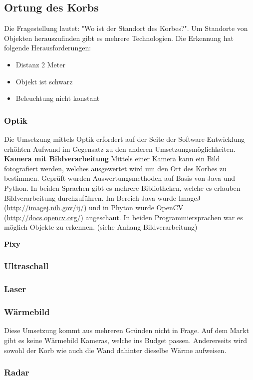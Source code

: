 \subsection{Ortung des Korbs}
Die Fragestellung lautet: "Wo ist der Standort des Korbes?". Um Standorte von Objekten herauszufinden gibt es mehrere Technologien. Die Erkennung hat folgende Herausforderungen:
\begin{itemize}
	\item Distanz 2 Meter
	\item Objekt ist schwarz
	\item Beleuchtung nicht konstant
\end{itemize}

\subsubsection{Optik}
Die Umsetzung mittels Optik erfordert auf der Seite der Software-Entwicklung erhöhten Aufwand im Gegensatz zu den anderen Umsetzungsmöglichkeiten.
\newline\newline
\textbf{Kamera mit Bildverarbeitung}\newline
Mittels einer Kamera kann ein Bild fotografiert werden, welches ausgewertet wird um den Ort des Korbes zu bestimmen. Geprüft wurden Auswertungsmethoden auf Basis von Java und Python. In beiden Sprachen gibt es mehrere Bibliotheken, welche es erlauben Bildverarbeitung durchzuführen. Im Bereich Java wurde ImageJ (\href{http://imagej.nih.gov/ij/}{http://imagej.nih.gov/ij/}) und in Phyton wurde OpenCV (\href{http://docs.opencv.org/}{http://docs.opencv.org/}) angeschaut. In beiden Programmiersprachen war es möglich Objekte zu erkennen. (siehe Anhang Bildverarbeitung)\newline

\textbf{Pixy}\newline



\subsubsection{Ultraschall}

\subsubsection{Laser}

\subsubsection{Wärmebild}
Diese Umsetzung kommt aus mehreren Gründen nicht in Frage. Auf dem Markt gibt es keine Wärmebild Kameras, welche ins Budget passen. Andererseits wird sowohl der Korb wie auch die Wand dahinter dieselbe Wärme aufweisen.

\subsubsection{Radar}